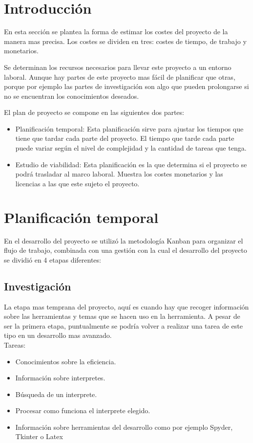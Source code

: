 
\section{Introducción}
En esta sección se plantea la forma de estimar los costes del proyecto de la manera mas precisa. Los costes se dividen en tres: costes de tiempo, de trabajo y monetarios.

Se determinan los recursos necesarios para llevar este proyecto a un entorno laboral. Aunque hay partes de este proyecto mas fácil de planificar que otras, porque por ejemplo las partes de investigación son algo que pueden prolongarse si no se encuentran los conocimientos deseados.

El plan de proyecto se compone en las siguientes dos partes:


\begin{itemize}
	\item Planificación temporal: Esta planificación sirve para ajustar los tiempos que tiene que tardar cada parte del proyecto. El tiempo que tarde cada parte puede variar según el nivel de complejidad y la cantidad de tareas que tenga.
	\item Estudio de viabilidad: Esta planificación es la que determina si el proyecto se podrá trasladar al marco laboral. Muestra los costes monetarios y las licencias a las que este sujeto el proyecto.
\end{itemize}



\section{Planificación temporal}
En el desarrollo del proyecto se utilizó la metodología Kanban para organizar el flujo de trabajo, combinada con una gestión con la cual el desarrollo del proyecto se dividió en 4 etapas diferentes:

\subsection{Investigación}
La etapa mas temprana del proyecto, aquí es cuando hay que recoger información sobre las herramientas y temas que se hacen uso en la herramienta. A  pesar de ser la primera etapa, puntualmente se podría volver a realizar una tarea de este tipo en un desarrollo mas avanzado.\\

Tareas:
\begin{itemize}
	\item Conocimientos sobre la eficiencia.
	\item Información sobre interpretes.
	\item Búsqueda de un interprete.
	\item Procesar como funciona el interprete elegido.
	\item Información sobre herramientas del desarrollo como por ejemplo Spyder, Tkinter o Latex
\end{itemize}

